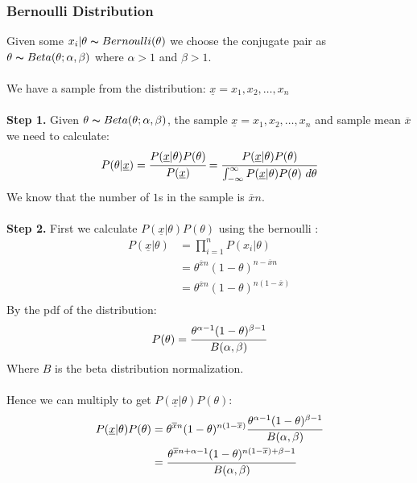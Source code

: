 \documentclass{report}
\begin{document}
            \subsubsection*{Bernoulli Distribution}
                Given some $x_i|\theta \thicksim Bernoulli(\theta)$ we choose the conjugate pair as $\theta \thicksim Beta(\theta; \alpha, \beta)$ where $\alpha> 1$ and $\beta > 1$.
                \\
                \\ We have a sample from the distribution: $\underline{x} = x_1, x_2, \dots, x_n$
                \\
                \\ \textbf{Step 1.} Given $\theta \thicksim Beta(\theta; \alpha, \beta)$, the sample $\underline{x} = x_1, x_2, \dots, x_n$ and sample mean $\overline{x}$
                we need to calculate:
                \[P(\theta|\underline{x}) = \cfrac{P(\underline{x}|\theta)P(\theta)}{P(\underline{x})} = \cfrac{P(\underline{x}|\theta)P(\theta)}{\int_{-\infty}^\infty P(\underline{x}|\theta)P(\theta) \ d\theta}\]
                We know that the number of $1$s in the sample is $\overline{x}n$.
                \\
                \\ \textbf{Step 2.} First we calculate $P(\underline{x}|\theta)P(\theta)$ using the bernoulli :
                \[\begin{split}
                    P(\underline{x}|\theta) &= \prod_{i=1}^n P(x_i|\theta) \\
                    &= \theta^{\overline{x}n}(1-\theta)^{n - \overline{x}n} \\
                    &= \theta^{\overline{x}n}(1-\theta)^{n(1 - \overline{x})} \\
                \end{split}\]
                By the pdf of the  distribution:
                \[P(\theta) = \cfrac{\theta^{\alpha - 1}(1 - \theta)^{\beta - 1}}{B(\alpha,\beta)}\]
                Where $B$ is the beta distribution normalization.
                \\
                \\ Hence we can multiply to get $P(\underline{x}|\theta)P(\theta)$:
                \[\begin{split}
                    P(\underline{x}|\theta)P(\theta) &= \theta^{\overline{x}n}(1-\theta)^{n(1 - \overline{x})}\cfrac{\theta^{\alpha - 1}(1 - \theta)^{\beta - 1}}{B(\alpha,\beta)} \\
                    &= \cfrac{\theta^{\overline{x}n + \alpha - 1}(1 - \theta)^{n(1 - \overline{x}) + \beta - 1}}{B(\alpha,\beta)} \\
                \end{split}\]
\end{document}
